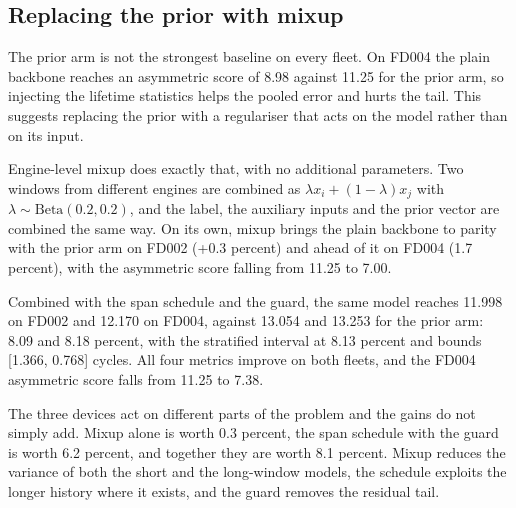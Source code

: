 
\subsection{Replacing the prior with mixup}

The prior arm is not the strongest baseline on every fleet. On FD004 the plain backbone reaches an asymmetric score of 8.98 against 11.25 for the prior arm, so injecting the lifetime statistics helps the pooled error and hurts the tail. This suggests replacing the prior with a regulariser that acts on the model rather than on its input.

Engine-level mixup does exactly that, with no additional parameters. Two windows from different engines are combined as $\lambda x_i+(1-\lambda)x_j$ with $\lambda\sim\mathrm{Beta}(0.2,0.2)$, and the label, the auxiliary inputs and the prior vector are combined the same way. On its own, mixup brings the plain backbone to parity with the prior arm on FD002 (+0.3 percent) and ahead of it on FD004 (1.7 percent), with the asymmetric score falling from 11.25 to 7.00.

Combined with the span schedule and the guard, the same model reaches 11.998 on FD002 and 12.170 on FD004, against 13.054 and 13.253 for the prior arm: 8.09 and 8.18 percent, with the stratified interval at 8.13 percent and bounds [1.366, 0.768] cycles. All four metrics improve on both fleets, and the FD004 asymmetric score falls from 11.25 to 7.38.

The three devices act on different parts of the problem and the gains do not simply add. Mixup alone is worth 0.3 percent, the span schedule with the guard is worth 6.2 percent, and together they are worth 8.1 percent. Mixup reduces the variance of both the short and the long-window models, the schedule exploits the longer history where it exists, and the guard removes the residual tail.
